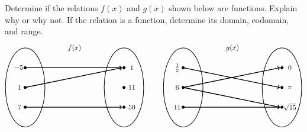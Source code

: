 \documentclass[11pt,letterpaper]{article}
\begin{document}

 Determine if the relations $f(x)$ and $g(x)$ shown below are functions. Explain why or why not. If the relation is a function, determine its domain, codomain, and range. 
	\[
	\begin{tikzpicture}
	\node at (2.5,2) {$f(x)$};
	\draw[line width=0.03cm] (0,0) circle (1 and 2);
	\draw[line width=0.03cm] (5,0) circle (1 and 2);
	
	\draw[fill=black] (0,1) circle (0.07);
	\draw[fill=black] (0,0) circle (0.07);
	\draw[fill=black] (0,-1) circle (0.07);
	
	\draw[fill=black] (5,1) circle (0.07);
	\draw[fill=black] (5,0) circle (0.07);
	\draw[fill=black] (5,-1) circle (0.07);
	
	\draw[line width=0.04cm,->] (0,1) -- (4.9,1);
	\draw[line width=0.04cm,->] (0,0) -- (4.9,1);
	\draw[line width=0.04cm,->] (0,-1) -- (4.9,-1);
	
	\node at (-0.3,1) {$\!-5$};
	\node at (-0.3,0) {$1$};
	\node at (-0.3,-1) {$7$};
	
	\node at (5.4,1) {$1$};
	\node at (5.4,0) {$11$};
	\node at (5.4,-1) {$50$};
	
	\tikzset{shift={(8,0)}}
	\node at (2.5,2) {$g(x)$};
	\draw[line width=0.03cm] (0,0) circle (1 and 2);
	\draw[line width=0.03cm] (5,0) circle (1 and 2);
	
	\draw[fill=black] (0,1) circle (0.07);
	\draw[fill=black] (0,0) circle (0.07);
	\draw[fill=black] (0,-1) circle (0.07);
	
	\draw[fill=black] (5,1) circle (0.07);
	\draw[fill=black] (5,0) circle (0.07);
	\draw[fill=black] (5,-1) circle (0.07);
	
	\draw[line width=0.04cm,->] (0,1) -- (4.9,0);
	\draw[line width=0.04cm,->] (0,0) -- (4.9,1);
	\draw[line width=0.04cm,->] (0,0) -- (4.9,-1);
	\draw[line width=0.04cm,->] (0,-1) -- (4.9,-1);
	
	\node at (-0.3,1) {$\frac{1}{2}$};
	\node at (-0.3,0) {$6$};
	\node at (-0.3,-1) {$11$};
	
	\node at (5.4,1) {$0$};
	\node at (5.4,0) {$\pi$};
	\node at (5.4,-1) {$\sqrt{15}$};
	\end{tikzpicture}
	\]
\end{document}
